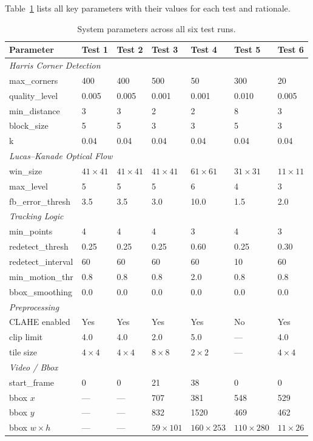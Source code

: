 \documentclass[12pt,a4paper]{article}
\begin{document}
Table~\ref{tab:params} lists all key parameters with their values for each test and rationale.

\begin{table}[H]
\centering
\caption{System parameters across all six test runs.}
\label{tab:params}
\scriptsize
\renewcommand{\arraystretch}{1.15}
\setlength{\tabcolsep}{4pt}
\begin{tabular}{l p{1.25cm} p{1.25cm} p{1.25cm} p{1.25cm} p{1.25cm} p{1.25cm}}
\toprule
\rowcolor{accentteal!20}
\textbf{Parameter} & \textbf{Test 1} & \textbf{Test 2} & \textbf{Test 3} & \textbf{Test 4} & \textbf{Test 5} & \textbf{Test 6} \\
\midrule
\multicolumn{7}{l}{\textit{Harris Corner Detection}} \\
\quad max\_corners & 400 & 400 & 500 & 50 & 300 & 20 \\
\quad quality\_level & 0.005 & 0.005 & 0.001 & 0.001 & 0.010 & 0.005 \\
\quad min\_distance & 3 & 3 & 2 & 2 & 8 & 3 \\
\quad block\_size & 5 & 5 & 3 & 3 & 5 & 3 \\
\quad k & 0.04 & 0.04 & 0.04 & 0.04 & 0.04 & 0.04 \\
\midrule
\multicolumn{7}{l}{\textit{Lucas--Kanade Optical Flow}} \\
\quad win\_size & $41\times41$ & $41\times41$ & $41\times41$ & $61\times61$ & $31\times31$ & $11\times11$ \\
\quad max\_level & 5 & 5 & 5 & 6 & 4 & 3 \\
\quad fb\_error\_thresh & 3.5 & 3.5 & 3.0 & 10.0 & 1.5 & 2.0 \\
\midrule
\multicolumn{7}{l}{\textit{Tracking Logic}} \\
\quad min\_points & 4 & 4 & 4 & 3 & 4 & 3 \\
\quad redetect\_thresh & 0.25 & 0.25 & 0.25 & 0.60 & 0.25 & 0.30 \\
\quad redetect\_interval & 60 & 60 & 60 & 60 & 10 & 60 \\
\quad min\_motion\_thr & 0.8 & 0.8 & 0.8 & 2.0 & 0.8 & 0.8 \\
\quad bbox\_smoothing & 0.0 & 0.0 & 0.0 & 0.0 & 0.0 & 0.0 \\
\midrule
\multicolumn{7}{l}{\textit{Preprocessing}} \\
\quad CLAHE enabled & Yes & Yes & Yes & Yes & No & Yes \\
\quad clip limit & 4.0 & 4.0 & 2.0 & 5.0 & --- & 4.0 \\
\quad tile size & $4\times4$ & $4\times4$ & $8\times8$ & $2\times2$ & --- & $4\times4$ \\
\midrule
\multicolumn{7}{l}{\textit{Video / Bbox}} \\
\quad start\_frame & 0 & 0 & 21 & 38 & 0 & 0 \\
\quad bbox $x$ & --- & --- & 707 & 381 & 548 & 529 \\
\quad bbox $y$ & --- & --- & 832 & 1520 & 469 & 462 \\
\quad bbox $w\times h$ & --- & --- & $59\times101$ & $160\times253$ & $110\times280$ & $11\times26$ \\
\bottomrule
\end{tabular}
\end{table}
\end{document}
